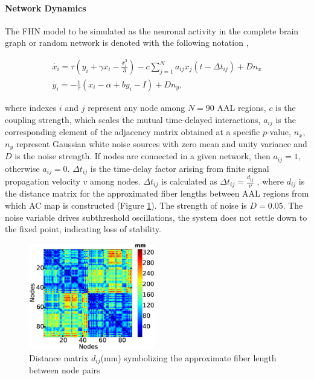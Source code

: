 \documentclass[fleqn,10pt]{wlpeerj}
\begin{document}
\paragraph{Network Dynamics}

The FHN model to be simulated as the neuronal activity in the complete brain graph or random network is denoted with the following notation \citep{GHO08, VUK13},  
 
\begin{subequations}
 \begin{align}\dot{x_i} = \tau \left( y_i + \gamma x_i - \frac{x_i^3}{3} \right) -c \sum_{j=1}^N a_{ij}x_j(t - \Delta t_{ij}) +Dn_x \label{eqn: frobenius 17}\\  \dot{y_i} = -\frac{1}{\tau} (x_i - \alpha + b y_i - I ) +Dn_y \label{eqn: frobenius 18}  , \end{align} 
\end{subequations}

where indexes $i$ and $j$ represent any node among $N=90$ AAL regions, $c$ is the coupling strength, which scales the mutual time-delayed interactions, $a_{ij}$ is the corresponding element of the adjacency matrix obtained at a specific $p$-value, $n_x$, $n_y$ represent Gaussian white noise sources with zero mean and unity variance and $D$ is the noise strength.
If nodes are connected in a given network, then $a_{ij}=1$, otherwise $a_{ij}=0$. $\Delta t_{ij}$ is the time-delay factor arising from finite signal propagation velocity $v$ among nodes. $\Delta t_{ij}$ is calculated as $\Delta t_{ij}=\frac{d_{ij}}{\nu}$ \citep{GHO08, GHO08a, DEC09}, where $d_{ij}$ is the distance matrix for the approximated fiber lengths between AAL regions from which AC map is constructed \citep{ITU08} (Figure \ref{fig:d_ij}). The strength of noise is $D=0.05$. The noise variable drives subthreshold oscillations, the system does not settle down to the fixed point, indicating loss of stability.


\begin{figure}[htpb]\centering
	 \includegraphics[width=0.49\textwidth]{Figures/distance_ACM_pyt.eps} 
	
\caption{Distance matrix $d_{ij}$(mm) symbolizing the approximate fiber length between node pairs}
\label{fig:d_ij}
\end{figure}
\end{document}
